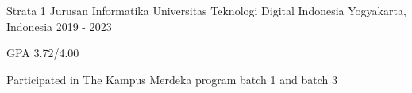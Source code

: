 

\begin{cventries}

  \cventry
    {Strata 1 Jurusan Informatika} %
    {Universitas Teknologi Digital Indonesia} %
    {Yogyakarta, Indonesia} %
    {2019 - 2023} %
    {
      \begin{cvitems} %
        \item {GPA 3.72/4.00}
        \item {Participated in The Kampus Merdeka program
          batch 1 and batch 3}
      \end{cvitems}
    }
\end{cventries}
